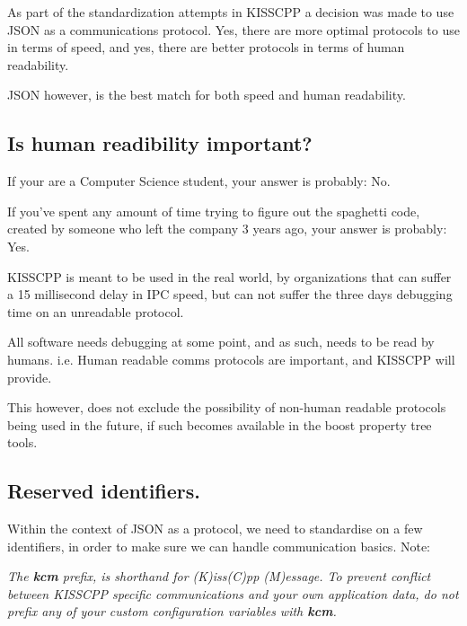 As part of the standardization attempts in K\-I\-S\-S\-C\-P\-P a decision was made to use J\-S\-O\-N as a communications protocol. Yes, there are more optimal protocols to use in terms of speed, and yes, there are better protocols in terms of human readability.

J\-S\-O\-N however, is the best match for both speed and human readability.

\subsection*{Is human readibility important?}

If your are a Computer Science student, your answer is probably\-: No.

If you've spent any amount of time trying to figure out the spaghetti code, created by someone who left the company 3 years ago, your answer is probably\-: Yes.

K\-I\-S\-S\-C\-P\-P is meant to be used in the real world, by organizations that can suffer a 15 millisecond delay in I\-P\-C speed, but can not suffer the three days debugging time on an unreadable protocol.

All software needs debugging at some point, and as such, needs to be read by humans. i.\-e. Human readable comms protocols are important, and K\-I\-S\-S\-C\-P\-P will provide.

This however, does not exclude the possibility of non-\/human readable protocols being used in the future, if such becomes available in the boost property tree tools.

\subsection*{Reserved identifiers.}

Within the context of J\-S\-O\-N as a protocol, we need to standardise on a few identifiers, in order to make sure we can handle communication basics. Note\-:

{\itshape The {\bfseries kcm} prefix, is shorthand for (K)iss(\-C)pp (M)essage. To prevent conflict between K\-I\-S\-S\-C\-P\-P specific communications and your own application data, do not prefix any of your custom configuration variables with {\bfseries kcm}.}

